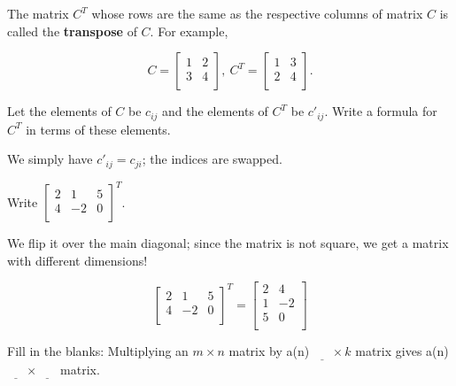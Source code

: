 \documentclass[../gatm_answers.tex]{subfiles}
\begin{document}
\begin{outer_problem}
\item The matrix $C^T$ whose rows are the same as the respective columns of matrix $C$ is called the \textbf{transpose} of $C$. For example,

$$C=\left[\begin{array}{cc}
1 & 2 \\
3 & 4 \\
\end{array}\right],\: C^T=\left[\begin{array}{cc}
1 & 3 \\
2 & 4 \\
\end{array}\right].$$
\end{outer_problem}

\begin{inner_problem}[start=1]
\item Let the elements of $C$ be $c_{ij}$ and the elements of $C^T$ be $c'_{ij}$. Write a formula for $C^T$ in terms of these elements.
\end{inner_problem}

We simply have $c'_{ij} = c_{ji}$; the indices are swapped.

\begin{inner_problem}
\item Write $\left[\begin{array}{ccc}
2 & 1 & 5 \\
4 & -2 & 0 \\
\end{array}\right]^T$.
\end{inner_problem}

We flip it over the main diagonal; since the matrix is not square, we get a matrix with different dimensions!

$$\left[\begin{array}{ccc}
2 & 1 & 5 \\
4 & -2 & 0 \\
\end{array}\right]^T = \begin{bmatrix}
2 & 4 \\
1 & -2 \\
5 & 0 \\
\end{bmatrix}$$

\begin{outer_problem}
\item Fill in the blanks: Multiplying an $m\times n$ matrix by a(n) $\underline{\phantom{egg}} \times k$ matrix gives a(n) $\underline{\phantom{egg}}\times\underline{\phantom{egg}}$ matrix.
\end{outer_problem}
\end{document}
